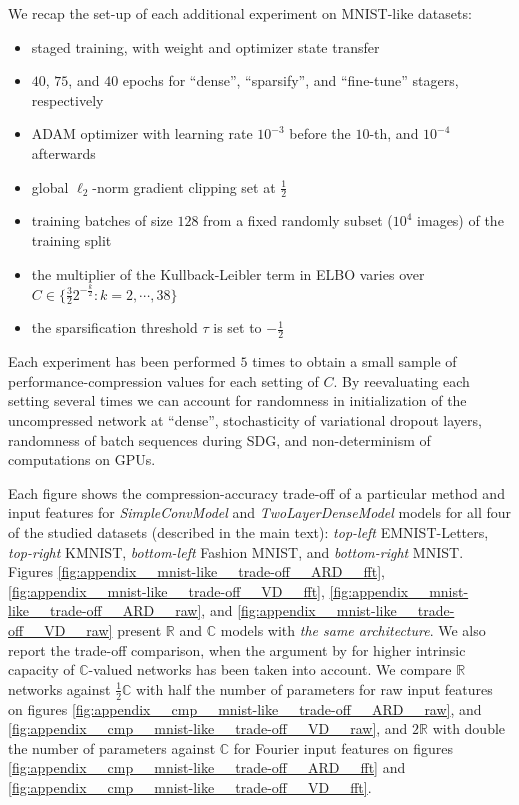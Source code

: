 \documentclass[a4paper,10pt]{article}
\newcommand{\real}{\mathbb{R}}
\newcommand{\cplx}{\mathbb{C}}
\begin{document}
We recap the set-up of each additional experiment on MNIST-like datasets:
\begin{itemize}
  \item staged training, with weight and optimizer state transfer
  \item $40$, $75$, and $40$ epochs for ``dense'', ``sparsify'', and ``fine-tune'' stagers, respectively
  \item ADAM optimizer with learning rate $10^{-3}$ before the $10$-th, and $10^{-4}$
  afterwards
  \item global $\ell_2$-norm gradient clipping set at $\tfrac12$
  \item training batches of size $128$ from a fixed randomly subset ($10^4$ images) of the training split
  \item the multiplier of the Kullback-Leibler term in ELBO varies over $
    C \in \{
      \tfrac32 2^{-\tfrac{k}2} \colon k=2, \cdots, 38
    \}
  $
  \item the sparsification threshold $\tau$ is set to $-\tfrac12$
\end{itemize}
Each experiment has been performed $5$ times to obtain a small sample of performance-compression
values for each setting of $C$. By reevaluating each setting several times we can account
for randomness in initialization of the uncompressed network at ``dense'', stochasticity of
variational dropout layers, randomness of batch sequences during SDG, and non-determinism
of computations on GPUs.

Each figure shows the compression-accuracy trade-off of a particular method and input features
for \textit{SimpleConvModel} and \textit{TwoLayerDenseModel} models for all four of the studied
datasets (described in the main text): \emph{top-left} EMNIST-Letters, \emph{top-right} KMNIST,
\emph{bottom-left} Fashion MNIST, and \emph{bottom-right} MNIST.
%
Figures \ref{fig:appendix__mnist-like__trade-off__ARD__fft}, \ref{fig:appendix__mnist-like__trade-off__VD__fft},
\ref{fig:appendix__mnist-like__trade-off__ARD__raw}, and \ref{fig:appendix__mnist-like__trade-off__VD__raw}
present $\real$ and $\cplx$ models with \emph{the same architecture}. We also report the
trade-off comparison, when the argument by \citet{monning_evaluation_2018} for higher intrinsic
capacity of $\cplx$-valued networks has been taken into account.
%
We compare $\real$ networks against $\tfrac12 \cplx$ with half the number of parameters
for raw input features on figures \ref{fig:appendix__cmp__mnist-like__trade-off__ARD__raw},
and \ref{fig:appendix__cmp__mnist-like__trade-off__VD__raw}, and $2 \real$ with
double the number of parameters against $\cplx$ for Fourier input features on figures
\ref{fig:appendix__cmp__mnist-like__trade-off__ARD__fft} and
\ref{fig:appendix__cmp__mnist-like__trade-off__VD__fft}.
\end{document}
